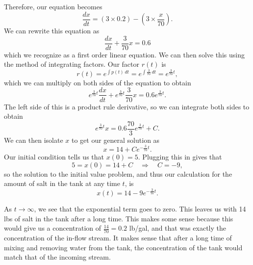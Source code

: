 \documentclass{ximera}
\begin{document}
\begin{exampleSol}
    Therefore, our equation becomes
    \begin{equation*}
        \frac{dx}{dt} = (3\times 0.2) - \left(3 \times \frac{x}{70}\right).
    \end{equation*} 
    We can rewrite this equation as
    \begin{equation*}
        \frac{dx}{dt} + \frac{3}{70}x = 0.6
    \end{equation*}
    which we recognize as a first order linear equation. We can then solve this using the method of integrating factors. Our factor $r(t)$ is
    \begin{equation*}
        r(t) = e^{\int p(t)\, dt} = e^{\int \frac{3}{70}\, dt} = e^{\frac{3}{70} t},
    \end{equation*}
    which we can multiply on both sides of the equation to obtain
    \begin{equation*}
        e^{\frac{3}{70} t} \frac{dx}{dt} + e^{\frac{3}{70} t} \frac{3}{70} x = 0.6 e^{\frac{3}{70} t}.
    \end{equation*}
    The left side of this is a product rule derivative, so we can integrate both sides to obtain
    \begin{equation*}
        e^{\frac{3}{70} t} x = 0.6 \frac{70}{3} e^{\frac{3}{70} t} + C.
    \end{equation*}
    We can then isolate $x$ to get our general solution as
    \begin{equation*}
        x = 14 + Ce^{-\frac{3}{70} t}.
    \end{equation*}
    Our initial condition tells us that $x(0) = 5$. Plugging this in gives that
    \begin{equation*}
        5 = x(0) = 14 + C \quad \Rightarrow \quad C = -9,
    \end{equation*}
    so the solution to the initial value problem, and thus our calculation for the amount of salt in the tank at any time $t$, is
    \begin{equation*}
        x(t) = 14 - 9e^{-\frac{3}{70} t}.
    \end{equation*}
    
    As $t\rightarrow \infty$, we see that the exponential term goes to zero. This leaves us with 14 lbs of salt in the tank after a long time. This makes some sense because this would give us a concentration of $\frac{14}{70} = 0.2$ lb/gal, and that was exactly the concentration of the in-flow stream. It makes sense that after a long time of mixing and removing water from the tank, the concentration of the tank would match that of the incoming stream.
\end{exampleSol}
\end{document}
